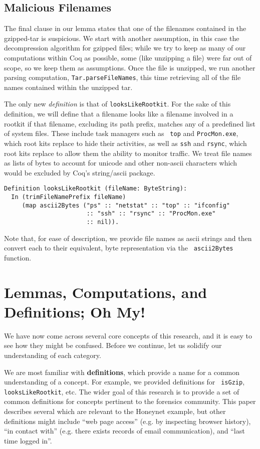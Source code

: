 \documentclass[nocopyrightspace]{sigplanconf}
\begin{document}
\subsection{Malicious Filenames}

The final clause in our lemma states that one of the filenames contained in
the gzipped-tar is suspicious. We start with  another assumption, in this case
the decompression algorithm for gzipped files; while we try to keep as many of
our computations within Coq as possible, some (like unzipping a file) were far
out of scope, so we keep them as assumptions. Once the file is unzipped, we
run another parsing computation, {\tt Tar.parseFileNames}, this time
retrieving all of the file names contained within the unzipped tar.

The only new {\it definition} is that of {\tt looksLikeRootkit}. For the sake
of this definition, we will define that a filename looks like a filename
involved in a rootkit if that filename, excluding its path prefix, matches any
of a predefined list of system files. These include task managers such as {\tt
top} and {\tt ProcMon.exe}, which root kits replace to hide their activities,
as well as {\tt ssh} and {\tt rsync}, which root kits replace to allow them
the ability to monitor traffic. We treat file names as lists of bytes to
account for unicode and other non-ascii characters which would be excluded by
Coq's string/ascii package.

\begin{lstlisting}
Definition looksLikeRootkit (fileName: ByteString):
  In (trimFileNamePrefix fileName) 
     (map ascii2Bytes ("ps" :: "netstat" :: "top" :: "ifconfig" 
                       :: "ssh" :: "rsync" :: "ProcMon.exe" 
                       :: nil)).
\end{lstlisting}

Note that, for ease of description, we provide file names as ascii strings and
then convert each to their equivalent, byte representation via the {\tt
ascii2Bytes} function.

\section{Lemmas, Computations, and Definitions; Oh My!}

We have now come across several core concepts of this research, and it is easy
to see how they might be confused. Before we continue, let us solidify our
understanding of each category.

We are most familiar with {\bf definitions}, which provide a name for a common
understanding of a concept. For example, we provided definitions for {\tt
isGzip}, {\tt looksLikeRootkit}, etc. The wider goal of this research is to
provide a set of common definitions for concepts pertinent to the forensics
community. This paper describes several which are relevant to the Honeynet
example, but other definitions might include ``web page access'' (e.g. by
inspecting browser history), ``in contact with'' (e.g. there exists records of
email communication), and ``last time logged in''.
\end{document}
